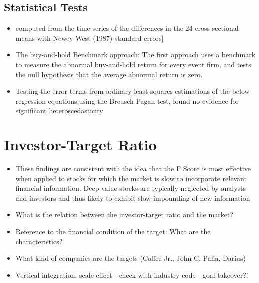 \documentclass[12pt]{article}
\begin{document}
\subsection{Statistical Tests}

    \begin{itemize}

        \item computed from the time-series of the differences in the 24 cross-sectional means with Newey-West (1987) standard errors] \citep{Choi2012}

        \item The buy-and-hold Benchmark approach: The first approach uses a benchmark to measure the abnormal buy-and-hold return for every event firm, and tests the null hypothesis that the average abnormal return is zero.\citep{ang2011}

        \item Testing the error terms from ordinary least-squares estimations of the below regression equations,using the Breusch-Pagan test, found no evidence for significant heteroscedasticity \citep{Brigida2012}


    \end{itemize}

\section{Investor-Target Ratio} 

    \begin{itemize}

        \item These findings are consistent with the idea that the F Score is most effective when applied to stocks for which the market is slow to incorporate relevant financial information. Deep value stocks are typically neglected by analysts and investors and thus likely to exhibit slow impounding of new information \citep{Hyde2014}
        
        \item What is the relation between the investor-target ratio and the market?
        
        \item Reference to the financial condition of the target: What are the characteristics?
        
        \item What kind of companies are the targets (Coffee Jr., John C. Palia, Darius)

        \item Vertical integration, scale effect - check with industry code - goal takeover?! 
        



    \end{itemize}
\end{document}
